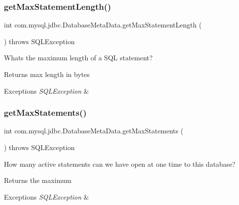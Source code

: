 \subsubsection{\texorpdfstring{get\+Max\+Statement\+Length()}{getMaxStatementLength()}}
{\footnotesize\ttfamily int com.\+mysql.\+jdbc.\+Database\+Meta\+Data.\+get\+Max\+Statement\+Length (\begin{DoxyParamCaption}{ }\end{DoxyParamCaption}) throws S\+Q\+L\+Exception}

What\textquotesingle{}s the maximum length of a S\+QL statement?

\begin{DoxyReturn}{Returns}
max length in bytes 
\end{DoxyReturn}

\begin{DoxyExceptions}{Exceptions}
{\em S\+Q\+L\+Exception} & \\
\hline
\end{DoxyExceptions}
\mbox{\label{classcom_1_1mysql_1_1jdbc_1_1_database_meta_data_a1ff21a2d6e3bf9439c03cf9d94c5c0c8}} 
\subsubsection{\texorpdfstring{get\+Max\+Statements()}{getMaxStatements()}}
{\footnotesize\ttfamily int com.\+mysql.\+jdbc.\+Database\+Meta\+Data.\+get\+Max\+Statements (\begin{DoxyParamCaption}{ }\end{DoxyParamCaption}) throws S\+Q\+L\+Exception}

How many active statements can we have open at one time to this database?

\begin{DoxyReturn}{Returns}
the maximum 
\end{DoxyReturn}

\begin{DoxyExceptions}{Exceptions}
{\em S\+Q\+L\+Exception} & \\
\hline
\end{DoxyExceptions}
\mbox{\label{classcom_1_1mysql_1_1jdbc_1_1_database_meta_data_a97c772e9574b61a6273423641e829b0b}} 
